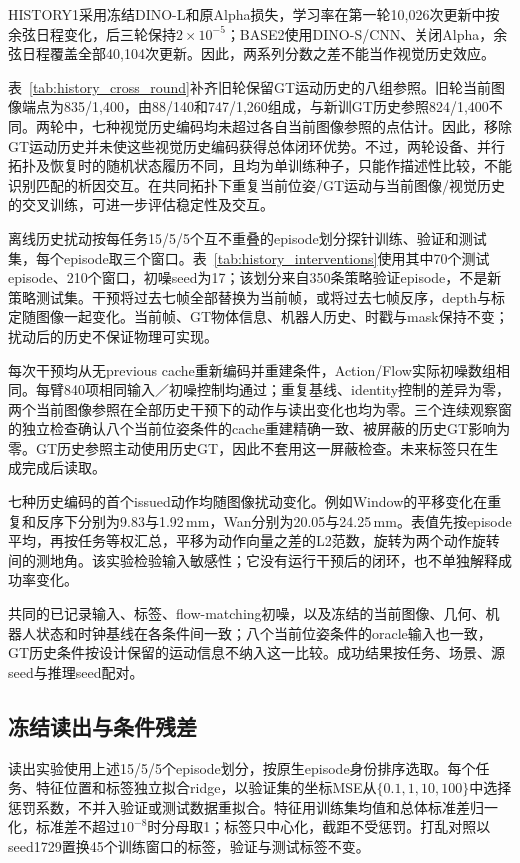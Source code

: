 HISTORY1采用冻结DINO-L和原Alpha损失，学习率在第一轮10,026次更新中按余弦日程变化，后三轮保持$2\times10^{-5}$；BASE2使用DINO-S/CNN、关闭Alpha，余弦日程覆盖全部40,104次更新。因此，两系列分数之差不能当作视觉历史效应。


表~\ref{tab:history_cross_round}补齐旧轮保留GT运动历史的八组参照。旧轮当前图像端点为835/1,400，由88/140和747/1,260组成，与新训GT历史参照824/1,400不同。两轮中，七种视觉历史编码均未超过各自当前图像参照的点估计。因此，移除GT运动历史并未使这些视觉历史编码获得总体闭环优势。不过，两轮设备、并行拓扑及恢复时的随机状态履历不同，且均为单训练种子，只能作描述性比较，不能识别匹配的析因交互。在共同拓扑下重复当前位姿/GT运动与当前图像/视觉历史的交叉训练，可进一步评估稳定性及交互。


离线历史扰动按每任务15/5/5个互不重叠的episode划分探针训练、验证和测试集，每个episode取三个窗口。表~\ref{tab:history_interventions}使用其中70个测试episode、210个窗口，初噪seed为17；该划分来自350条策略验证episode，不是新策略测试集。干预将过去七帧全部替换为当前帧，或将过去七帧反序，depth与标定随图像一起变化。当前帧、GT物体信息、机器人历史、时戳与mask保持不变；扰动后的历史不保证物理可实现。

每次干预均从无previous cache重新编码并重建条件，Action/Flow实际初噪数组相同。每臂840项相同输入／初噪控制均通过；重复基线、identity控制的差异为零，两个当前图像参照在全部历史干预下的动作与读出变化也均为零。三个连续观察窗的独立检查确认八个当前位姿条件的cache重建精确一致、被屏蔽的历史GT影响为零。GT历史参照主动使用历史GT，因此不套用这一屏蔽检查。未来标签只在生成完成后读取。

七种历史编码的首个issued动作均随图像扰动变化。例如Window的平移变化在重复和反序下分别为9.83与1.92\,mm，Wan分别为20.05与24.25\,mm。表值先按episode平均，再按任务等权汇总，平移为动作向量之差的L2范数，旋转为两个动作旋转间的测地角。该实验检验输入敏感性；它没有运行干预后的闭环，也不单独解释成功率变化。

共同的已记录输入、标签、flow-matching初噪，以及冻结的当前图像、几何、机器人状态和时钟基线在各条件间一致；八个当前位姿条件的oracle输入也一致，GT历史条件按设计保留的运动信息不纳入这一比较。成功结果按任务、场景、源seed与推理seed配对。

\subsection{冻结读出与条件残差}
读出实验使用上述15/5/5个episode划分，按原生episode身份排序选取。每个任务、特征位置和标签独立拟合ridge，以验证集的坐标MSE从$\{0.1,1,10,100\}$中选择惩罚系数，不并入验证或测试数据重拟合。特征用训练集均值和总体标准差归一化，标准差不超过$10^{-8}$时分母取1；标签只中心化，截距不受惩罚。打乱对照以seed1729置换45个训练窗口的标签，验证与测试标签不变。


